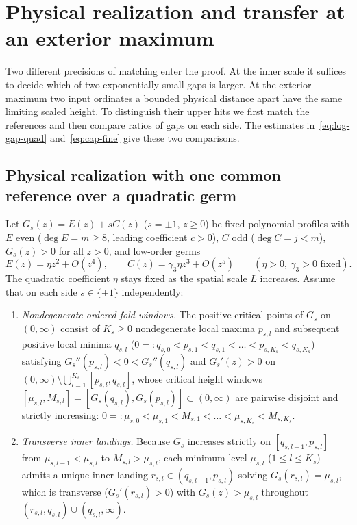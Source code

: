 \section{Physical realization and transfer at an exterior maximum}\label{sec:transfer}

Two different precisions of matching enter the proof. At the inner scale it
suffices to decide which of two exponentially small gaps is larger. At the
exterior maximum two input ordinates a bounded physical distance apart
have the same limiting scaled height. To distinguish their upper hits we
first match the references and then compare ratios of gaps on each side.
The estimates in~\eqref{eq:log-gap-quad} and~\eqref{eq:cap-fine} give these
two comparisons.

\subsection{Physical realization with one common reference over a quadratic germ}\label{subsec:quad-realize}
Let $G_s(z)=E(z)+sC(z)$ ($s=\pm 1$, $z\ge 0$) be fixed polynomial profiles with $E$ even ($\deg E=m\ge 8$, leading coefficient $c>0$), $C$ odd ($\deg C=j<m$), $G_s(z)>0$ for all $z>0$, and low-order germs
\begin{equation}\label{eq:quad-germs}
  E(z) = \eta z^2 + O(z^4),\qquad C(z) = \gamma_3 \eta z^3 + O(z^5)\qquad (\eta>0,\ \gamma_3>0\text{ fixed}).
\end{equation}
The quadratic coefficient $\eta$ stays fixed as the spatial scale $L$ increases.
Assume that on each side $s\in\{\pm 1\}$ independently:
\begin{enumerate}
  \item[\textup{(H1)}] \emph{Nondegenerate ordered fold windows.} The positive critical points of $G_s$ on $(0,\infty)$ consist of $K_s\ge 0$ nondegenerate local maxima $p_{s,l}$ and subsequent positive local minima $q_{s,l}$ ($0=:q_{s,0}<p_{s,1}<q_{s,1}<\dots<p_{s,K_s}<q_{s,K_s}$) satisfying $G_s''(p_{s,l})<0<G_s''(q_{s,l})$ and $G_s'(z)>0$ on $(0,\infty)\setminus\bigcup_{l=1}^{K_s}[p_{s,l},q_{s,l}]$, whose critical height windows $[\mu_{s,l},M_{s,l}]=[G_s(q_{s,l}),G_s(p_{s,l})]\subset(0,\infty)$ are pairwise disjoint and strictly increasing: $0=:\mu_{s,0}<\mu_{s,1}<M_{s,1}<\dots<\mu_{s,K_s}<M_{s,K_s}$.
  \item[\textup{(H2)}] \emph{Transverse inner landings.} Because $G_s$ increases strictly on $[q_{s,l-1},p_{s,l}]$ from $\mu_{s,l-1}<\mu_{s,l}$ to $M_{s,l}>\mu_{s,l}$, each minimum level $\mu_{s,l}$ ($1\le l\le K_s$) admits a unique inner landing $r_{s,l}\in(q_{s,l-1},p_{s,l})$ solving $G_s(r_{s,l})=\mu_{s,l}$, which is transverse ($G_s'(r_{s,l})>0$) with $G_s(z)>\mu_{s,l}$ throughout $(r_{s,l},q_{s,l})\cup(q_{s,l},\infty)$.
\end{enumerate}

